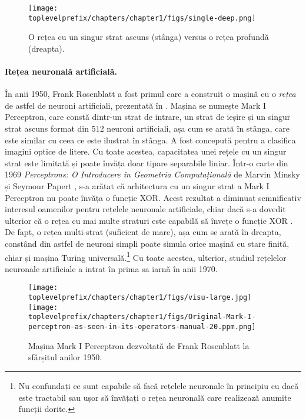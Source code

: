 \documentclass[../../book-main_ro.tex]{subfiles}
\begin{document}
\begin{figure}[t]
\centering
\texttt{[image: \\toplevelprefix/chapters/chapter1/figs/single-deep.png]}
    \caption{O rețea cu un singur strat ascuns (stânga) versus o rețea profundă (dreapta).}
    \label{fig:single-deep}
\end{figure}
\paragraph{Rețea neuronală artificială.}
În anii 1950, Frank Rosenblatt a fost primul care a construit o mașină cu o {\em rețea} de astfel de neuroni artificiali, prezentată în . Mașina se numește Mark I Perceptron, care constă dintr-un strat de intrare, un strat de ieșire și un singur strat ascuns format din 512 neuroni artificiali, așa cum se arată în  stânga, care este similar cu ceea ce este ilustrat în  stânga. A fost concepută pentru a clasifica imagini optice de litere. Cu toate acestea, capacitatea unei rețele cu un singur strat este limitată și poate învăța doar tipare separabile liniar. Într-o carte din 1969 {\em Perceptrons: O Introducere în Geometria Computațională} de Marvin Minsky și Seymour Papert \cite{Minsky-1969}, s-a arătat că arhitectura cu un singur strat a Mark I Perceptron nu poate învăța o funcție XOR. Acest rezultat a diminuat semnificativ interesul oamenilor pentru rețelele neuronale artificiale, chiar dacă s-a dovedit ulterior că o rețea cu mai multe straturi este capabilă să învețe o funcție XOR \cite{Rumelhart1986}. De fapt, o rețea multi-strat (suficient de mare), așa cum se arată în  dreapta, constând din astfel de neuroni simpli poate simula orice mașină cu stare finită, chiar și mașina Turing universală.\footnote{Nu confundați ce sunt capabile să facă rețelele neuronale în principiu cu dacă este tractabil sau ușor să învățați o rețea neuronală care realizează anumite funcții dorite.} Cu toate acestea, ulterior, studiul rețelelor neuronale artificiale a intrat în prima sa iarnă în anii 1970.

\begin{figure}
    \centering
    \texttt{[image: \\toplevelprefix/chapters/chapter1/figs/visu-large.jpg]}
    \hspace{2mm} \texttt{[image: \\toplevelprefix/chapters/chapter1/figs/Original-Mark-I-perceptron-as-seen-in-its-operators-manual-20.ppm.png]}
    \caption{Mașina Mark I Perceptron dezvoltată de Frank Rosenblatt la sfârșitul anilor 1950.}
    \label{fig:perceptron}
\end{figure}
\end{document}
